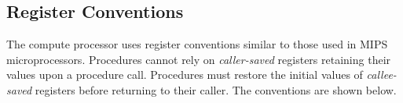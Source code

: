 \newcommand{\RawTag}{}
\newcommand{\RawTagH}{RawH}
\newcommand{\MIPSTag}{MIPS}
\newcommand{\rawJxxLink}{[31]\ \ \  \(\leftarrow\) \{ PC + 4 \}\(\sb{31..00}\)}
\newcommand{\rawJxxLb}{PC\({\sb{31..02}}\) \(\leftarrow\) ({\em{zero-extend-16-to-30}} targ16)}
\newcommand{\rawJxxZeroLowBits}{PC\({\sb{01..00}}\) \(\leftarrow\) 0}

\subsection{Register Conventions}
The compute processor uses register conventions similar to those used in MIPS microprocessors.
Procedures cannot rely on {\em caller-saved} registers retaining their values upon a procedure call.
Procedures must restore the initial values of {\em callee-saved} registers before returning to their caller.
The conventions are shown below.
\vspace{5mm}


\tablestretch

